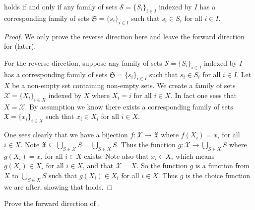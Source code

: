 \begin{theorem}\label{theorem:axiom-of-choice-equivalent}
     holds if and only if any family of sets $\mathcal{S} = \{S_i\}_{i \in I}$ indexed by $I$ has a corresponding family of sets $\mathfrak{S} = \{s_i\}_{i\in I}$ such that $s_i \in S_i$ for all $i \in I$.
\end{theorem}
\begin{proof}
    We only prove the reverse direction here and leave the forward direction for  (later).

    For the reverse direction, suppose any family of sets $\mathcal{S} = \{S_i\}_{i \in I}$ indexed by $I$ has a corresponding family of sets $\mathfrak{S} = \{s_i\}_{i\in I}$ such that $s_i \in S_i$ for all $i \in I$. Let $X$ be a non-empty set containing non-empty sets. We create a family of sets $\mathcal{X} = \{X_i\}_{i \in X}$ indexed by $X$ where $X_i = i$ for all $i \in X$. In fact one sees that $X = \mathcal{X}$. By assumption we know there exists a corresponding family of sets $\mathfrak{X} = \{x_i\}_{i \in X}$ such that $x_i \in X_i$ for all $i \in X$. 

    One sees clearly that we have a bijection $f: \mathcal{X} \to \mathfrak{X}$ where $f(X_i) = x_i$ for all $i \in X$. Note $\mathfrak{X} \subseteq \bigcup_{S \in \mathcal{X}} S = \bigcup_{S \in X} S$. Thus the function $g: \mathcal{X} \to \bigcup_{S \in X} S$ where $g(X_i) = x_i$ for all $i \in X$ exists. Note also that $x_i \in X_i$ which means $g(X_i) \in X_i$ for all $i \in X$, and that $\mathcal{X} = X$. So the function $g$ is a function from $X$ to $\bigcup_{S \in X} S$ such that $g(X_i) \in X_i$ for all $i \in X$. Thus $g$ is the choice function we are after, showing that  holds.
\end{proof}

\begin{exercise}\label{exercise:axiom-of-choice-equivalent}
    Prove the forward direction of .
\end{exercise}
